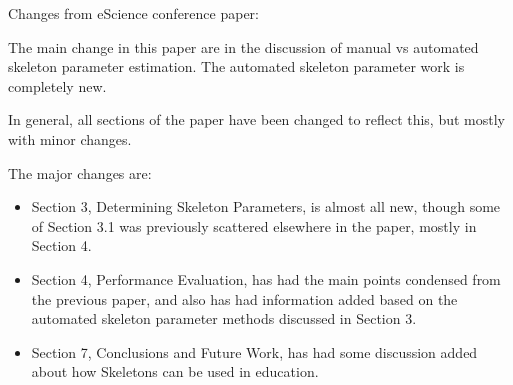 \documentclass[11pt]{letter} %
\begin{document}
Changes from eScience conference paper:

The main change in this paper are in the discussion of manual vs automated skeleton parameter estimation.  The automated skeleton parameter work is completely new.

In general, all sections of the paper have been changed to reflect this, but mostly with minor changes.

The major changes are:

\begin{itemize}
\item Section 3, Determining Skeleton Parameters, is almost all new, though some of Section 3.1 was previously scattered elsewhere in the paper, mostly in Section 4.
\item Section 4, Performance Evaluation, has had the main points condensed from the previous paper, and also has had information added based on the automated skeleton parameter methods discussed in Section 3.
\item Section 7, Conclusions and Future Work, has had some discussion added about how Skeletons can be used in education.
\end{itemize}
\end{document}
